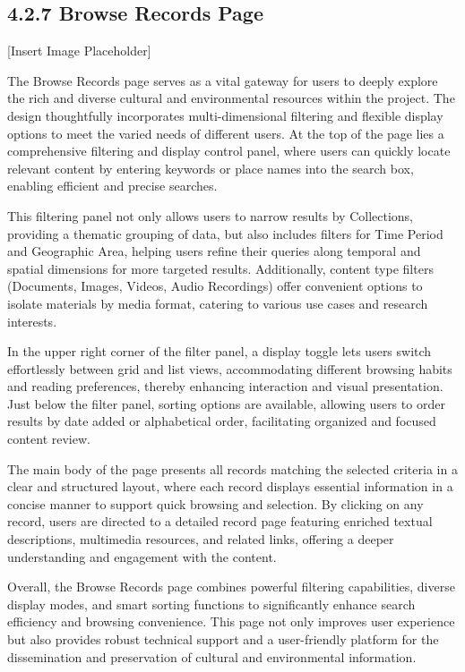 \subsection*{4.2.7 Browse Records Page}
[Insert Image Placeholder]

The Browse Records page serves as a vital gateway for users to deeply explore the rich and diverse cultural and environmental resources within the project. The design thoughtfully incorporates multi-dimensional filtering and flexible display options to meet the varied needs of different users. At the top of the page lies a comprehensive filtering and display control panel, where users can quickly locate relevant content by entering keywords or place names into the search box, enabling efficient and precise searches.

This filtering panel not only allows users to narrow results by Collections, providing a thematic grouping of data, but also includes filters for Time Period and Geographic Area, helping users refine their queries along temporal and spatial dimensions for more targeted results. Additionally, content type filters (Documents, Images, Videos, Audio Recordings) offer convenient options to isolate materials by media format, catering to various use cases and research interests.

In the upper right corner of the filter panel, a display toggle lets users switch effortlessly between grid and list views, accommodating different browsing habits and reading preferences, thereby enhancing interaction and visual presentation. Just below the filter panel, sorting options are available, allowing users to order results by date added or alphabetical order, facilitating organized and focused content review.

The main body of the page presents all records matching the selected criteria in a clear and structured layout, where each record displays essential information in a concise manner to support quick browsing and selection. By clicking on any record, users are directed to a detailed record page featuring enriched textual descriptions, multimedia resources, and related links, offering a deeper understanding and engagement with the content.

Overall, the Browse Records page combines powerful filtering capabilities, diverse display modes, and smart sorting functions to significantly enhance search efficiency and browsing convenience. This page not only improves user experience but also provides robust technical support and a user-friendly platform for the dissemination and preservation of cultural and environmental information.

